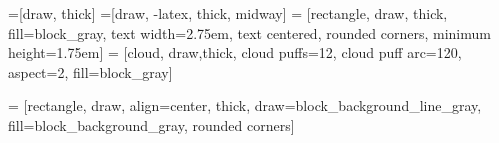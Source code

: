 




=[draw, thick]
=[draw, -latex, thick, midway] 
 = [rectangle, draw, thick, fill=block_gray, 
    text width=2.75em, text centered, rounded corners, minimum height=1.75em]
 = [cloud, draw,thick, cloud puffs=12, cloud puff arc=120, aspect=2, fill=block_gray]



 = [rectangle, draw, align=center, thick, draw=block_background_line_gray, fill=block_background_gray, rounded corners]


%

